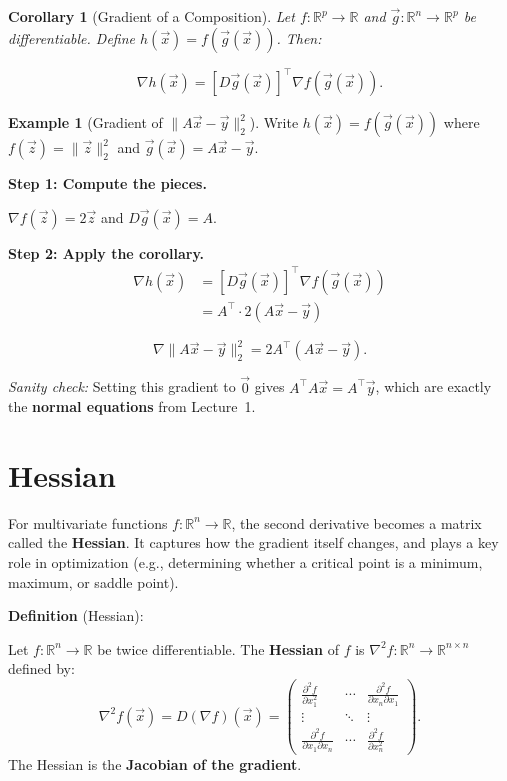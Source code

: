 \documentclass[10pt, twocolumn]{article}
\theoremstyle{definition}
\newtheorem{example}{Example}
\theoremstyle{plain}
\newtheorem{corollary}{Corollary}
\newcommand{\RR}{\mathbb{R}}
\begin{document}
\begin{corollary}[Gradient of a Composition]
Let $f: \RR^p \to \RR$ and $\vec{g}: \RR^n \to \RR^p$ be differentiable. Define $h(\vec{x}) = f(\vec{g}(\vec{x}))$. Then:
\begin{result}
\[
    \nabla h(\vec{x}) = [D\vec{g}(\vec{x})]^\top \nabla f(\vec{g}(\vec{x})).
\]
\end{result}
\end{corollary}

\begin{example}[Gradient of $\|A\vec{x} - \vec{y}\|_2^2$]
Write $h(\vec{x}) = f(\vec{g}(\vec{x}))$ where $f(\vec{z}) = \|\vec{z}\|_2^2$ and $\vec{g}(\vec{x}) = A\vec{x} - \vec{y}$.

\textbf{Step 1: Compute the pieces.}

$\nabla f(\vec{z}) = 2\vec{z}$ and $D\vec{g}(\vec{x}) = A$.

\textbf{Step 2: Apply the corollary.}
\begin{align*}
    \nabla h(\vec{x}) &= [D\vec{g}(\vec{x})]^\top \nabla f(\vec{g}(\vec{x})) \\
    &= A^\top \cdot 2(A\vec{x} - \vec{y})
\end{align*}
\begin{result}
\[
    \nabla \|A\vec{x} - \vec{y}\|_2^2 = 2A^\top(A\vec{x} - \vec{y}).
\]
\end{result}
\end{example}

\textit{Sanity check:} Setting this gradient to $\vec{0}$ gives $A^\top A \vec{x} = A^\top \vec{y}$, which are exactly the \textbf{normal equations} from Lecture~1. \checkmark

\section{Hessian}

For multivariate functions $f: \RR^n \to \RR$, the second derivative becomes a matrix called the \textbf{Hessian}. It captures how the gradient itself changes, and plays a key role in optimization (e.g., determining whether a critical point is a minimum, maximum, or saddle point).

\begin{tcolorbox}
\textbf{Definition} (Hessian):

Let $f: \RR^n \to \RR$ be twice differentiable. The \textbf{Hessian} of $f$ is $\nabla^2 f: \RR^n \to \RR^{n \times n}$ defined by:
\[
    \nabla^2 f(\vec{x}) = D(\nabla f)(\vec{x}) = \begin{pmatrix} \frac{\partial^2 f}{\partial x_1^2} & \!\cdots\! & \frac{\partial^2 f}{\partial x_n \partial x_1} \\ \vdots & \!\ddots\! & \vdots \\ \frac{\partial^2 f}{\partial x_1 \partial x_n} & \!\cdots\! & \frac{\partial^2 f}{\partial x_n^2} \end{pmatrix}.
\]
The Hessian is the \textbf{Jacobian of the gradient}.
\end{tcolorbox}
\end{document}
